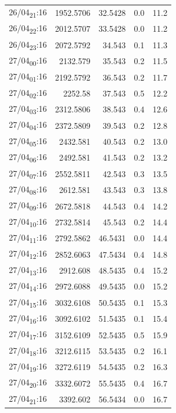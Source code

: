 \documentclass[11pt]{article}
\begin{document}
\begin{table}[htbp]
\begin{tabular}{lrrrr}
26/04\textsubscript{21}:16 & 1952.5706 & 32.5428 & 0.0 & 11.2\\[0pt]
26/04\textsubscript{22}:16 & 2012.5707 & 33.5428 & 0.0 & 11.2\\[0pt]
26/04\textsubscript{23}:16 & 2072.5792 & 34.543 & 0.1 & 11.3\\[0pt]
27/04\textsubscript{00}:16 & 2132.579 & 35.543 & 0.2 & 11.5\\[0pt]
27/04\textsubscript{01}:16 & 2192.5792 & 36.543 & 0.2 & 11.7\\[0pt]
27/04\textsubscript{02}:16 & 2252.58 & 37.543 & 0.5 & 12.2\\[0pt]
27/04\textsubscript{03}:16 & 2312.5806 & 38.543 & 0.4 & 12.6\\[0pt]
27/04\textsubscript{04}:16 & 2372.5809 & 39.543 & 0.2 & 12.8\\[0pt]
27/04\textsubscript{05}:16 & 2432.581 & 40.543 & 0.2 & 13.0\\[0pt]
27/04\textsubscript{06}:16 & 2492.581 & 41.543 & 0.2 & 13.2\\[0pt]
27/04\textsubscript{07}:16 & 2552.5811 & 42.543 & 0.3 & 13.5\\[0pt]
27/04\textsubscript{08}:16 & 2612.581 & 43.543 & 0.3 & 13.8\\[0pt]
27/04\textsubscript{09}:16 & 2672.5818 & 44.543 & 0.4 & 14.2\\[0pt]
27/04\textsubscript{10}:16 & 2732.5814 & 45.543 & 0.2 & 14.4\\[0pt]
27/04\textsubscript{11}:16 & 2792.5862 & 46.5431 & 0.0 & 14.4\\[0pt]
27/04\textsubscript{12}:16 & 2852.6063 & 47.5434 & 0.4 & 14.8\\[0pt]
27/04\textsubscript{13}:16 & 2912.608 & 48.5435 & 0.4 & 15.2\\[0pt]
27/04\textsubscript{14}:16 & 2972.6088 & 49.5435 & 0.0 & 15.2\\[0pt]
27/04\textsubscript{15}:16 & 3032.6108 & 50.5435 & 0.1 & 15.3\\[0pt]
27/04\textsubscript{16}:16 & 3092.6102 & 51.5435 & 0.1 & 15.4\\[0pt]
27/04\textsubscript{17}:16 & 3152.6109 & 52.5435 & 0.5 & 15.9\\[0pt]
27/04\textsubscript{18}:16 & 3212.6115 & 53.5435 & 0.2 & 16.1\\[0pt]
27/04\textsubscript{19}:16 & 3272.6119 & 54.5435 & 0.2 & 16.3\\[0pt]
27/04\textsubscript{20}:16 & 3332.6072 & 55.5435 & 0.4 & 16.7\\[0pt]
27/04\textsubscript{21}:16 & 3392.602 & 56.5434 & 0.0 & 16.7\\[0pt]

\end{tabular}
\end{table}
\end{document}
